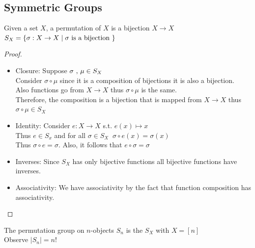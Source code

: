\subsection{Symmetric Groups}

\begin{definition}
    Given a set \(X\), a permutation of \(X\) is
    a bijection \(X \rightarrow X\)\\
    \(S_X=\left\{ \sigma : X \rightarrow X \mid \sigma \text{ is a bijection } \right\}\)
\end{definition}


\begin{proof}
    \phantom{}

    \begin{itemize}
        \item Closure: Suppose \(\sigma\text{ , }\mu \in S_X\)\\
        Consider \(\sigma \circ \mu\) since it is a composition of bijections
        it is also a bijection.\\ Also functions go from
        \(X \rightarrow X\) thus \(\sigma \circ \mu\) is the same.\\
        Therefore, the composition is a bijection that is mapped from 
        \(X \rightarrow X\) thus \(\sigma \circ \mu \in S_X\)
        \item Identity: Consider \(e : X \rightarrow X\) s.t. \(e(x)\mapsto x\)\\
        Thus \(e \in S_x\) and for all \(\sigma \in S_X\;\; \sigma \circ e(x)=\sigma(x)\)\\ 
        Thus \(\sigma \circ e = \sigma\). Also, it follows that \(e \circ \sigma=\sigma\)
        \item Inverses: Since \(S_X\) has only bijective functions
        all bijective functions have inverses.
        \item Associativity: We have associativity by the fact that function
        composition has associativity.
    \end{itemize}
\end{proof}

\begin{definition}
    The permutation group on \(n\)-objects \(S_n\) is the \(S_X\) with \(X=[n]\)\\
    Observe \(\mid S_n \mid = n!\)
\end{definition}

